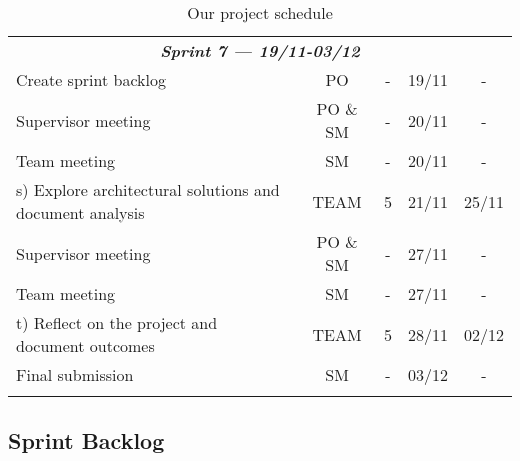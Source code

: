\begin{longtable}[c]{@{}lcccc@{}}
\multicolumn{5}{c}{\textit{\textbf{Sprint 7 --- 19/11-03/12}}}                                                                         \\
Create sprint backlog                                    & PO                   & -                 & 19/11          & -            \\
Supervisor meeting                                       & PO \& SM             & -                 & 20/11          & -            \\
Team meeting                                             & SM                   & -                 & 20/11          & -            \\
s) Explore architectural solutions and document analysis & TEAM                 & 5                 & 21/11          & 25/11        \\
Supervisor meeting                                       & PO \& SM             & -                 & 27/11          & -            \\
Team meeting                                             & SM                   & -                 & 27/11          & -            \\
t) Reflect on the project and document outcomes          & TEAM                 & 5                 & 28/11          & 02/12        \\
Final submission                                         & SM                   & -                 & 03/12          & -            \\* \bottomrule
\caption{Our project schedule}
\label{table_schedule}\\
\end{longtable}


\subsection{Sprint Backlog}

